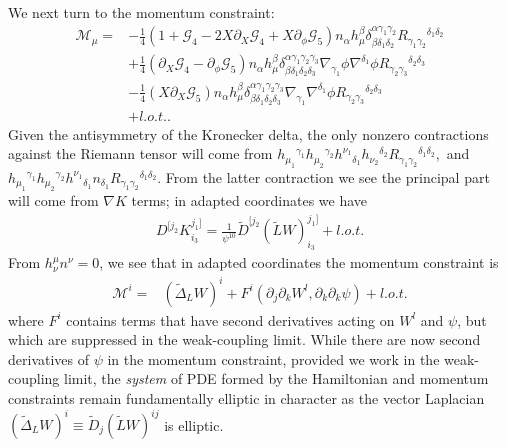 \documentclass{ws-ijmpd}
\begin{document}
We next turn to the momentum constraint:
\begin{align}
\label{eq:intermediate_principal_part_mom_ctt}
   \mathcal{M}_{\mu}
   =&
   -
   \frac{1}{4}\left(
      1 
      + 
      \mathcal{G}_4 
      - 
      2X\partial_X\mathcal{G}_4 
      + 
      X \partial_{\phi}\mathcal{G}_5
   \right)
   n_{\alpha}h_{\mu}^{\beta}
   \delta^{\alpha\gamma_1\gamma_2}_{\beta\delta_1\delta_2}
   R_{\gamma_1\gamma_2}{}^{\delta_1\delta_2}
   \nonumber\\
   &+
   \frac{1}{4}\left(
      \partial_X\mathcal{G}_4
      -
      \partial_{\phi}\mathcal{G}_5
   \right)
   n_{\alpha}h_{\mu}^{\beta}
   \delta^{\alpha\gamma_1\gamma_2\gamma_3}_{\beta\delta_1\delta_2\delta_3}
   \nabla_{\gamma_1}\phi\nabla^{\delta_1}\phi
   R_{\gamma_2\gamma_3}{}^{\delta_2\delta_3}
   \nonumber\\
   &-
   \frac{1}{4}
   \left(X\partial_X\mathcal{G}_5\right)
   n_{\alpha}h_{\mu}^{\beta}
   \delta^{\alpha\gamma_1\gamma_2\gamma_3}_{\beta\delta_1\delta_2\delta_3}
   \nabla_{\gamma_1}\nabla^{\delta_1}\phi
   R_{\gamma_2\gamma_3}{}^{\delta_2\delta_3}
   \nonumber\\
   &+
   l.o.t.
   .
\end{align}
Given the antisymmetry of the Kronecker delta, the only nonzero contractions
against the Riemann tensor will come from
$   
h_{\mu_1}{}^{\gamma_1}
h_{\mu_2}{}^{\gamma_2}
h^{\nu_1}{}_{\delta_1}
h_{\nu_2}{}^{\delta_2}
R_{\gamma_1\gamma_2}{}^{\delta_1\delta_2}
,
$
and
$   
h_{\mu_1}{}^{\gamma_1}
h_{\mu_2}{}^{\gamma_2}
h^{\nu_1}{}_{\delta_1}
n_{\delta_1}
R_{\gamma_1\gamma_2}{}^{\delta_1\delta_2}
.
$
From the latter contraction we see the principal part will come
from $\nabla K$ terms; in adapted coordinates we have 
\begin{align}
   D^{[j_2}K^{j_1]}_{i_3}
   =
   \frac{1}{\psi^{10}}\tilde{D}^{[j_2}\left(\tilde{L}W\right)^{j_1]}_{i_3}
   +
   l.o.t.
\end{align}
From $h^{\mu}_{\nu}n^{\nu}=0$, we see that in adapted coordinates
the momentum constraint is
\begin{align}
\label{eq:principal_part_mom_ctt}
   \mathcal{M}^{i}
   =&
   \left(\tilde{\Delta}_LW\right)^i
   +
   F^i\left(\partial_j\partial_kW^l,\partial_k\partial_k\psi\right)
   +
   l.o.t.
\end{align}
where $F^i$ contains terms that have second derivatives acting on
$W^l$ and $\psi$, but which are suppressed in the weak-coupling limit.
While there are now second derivatives of $\psi$ in the momentum
constraint, provided we work in the weak-coupling limit, the
\emph{system} of PDE formed by the Hamiltonian and momentum constraints
remain fundamentally elliptic in character as the vector Laplacian
$\left(\tilde{\Delta}_LW\right)^i
\equiv 
\tilde{D}_j\left(\tilde{L}W\right)^{ij}$ 
is elliptic.
\end{document}
